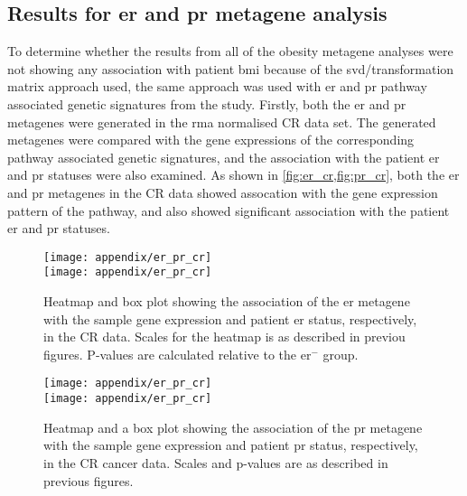 \begin{appendices}
\section{Results for \gls{er} and \gls{pr} metagene analysis}
\label{sec:results_for_er_and_pr_metagene_analysis}

To determine whether the results from all of the obesity metagene analyses were not showing any association with patient \gls{bmi} because of the \gls{svd}/transformation matrix approach used, the same approach was used with \gls{er} and \gls{pr} pathway associated genetic signatures from the \citet{Gatza2010a} study.
Firstly, both the \gls{er} and \gls{pr} metagenes were generated in the \gls{rma} normalised CR data set.
The generated metagenes were compared with the gene expressions of the corresponding pathway associated genetic signatures, and the association with the patient \gls{er} and \gls{pr} statuses were also examined.
As shown in \cref{fig:er_cr,fig:pr_cr}, both the \gls{er} and \gls{pr} metagenes in the CR data showed assocation with the gene expression pattern of the pathway, and also showed significant association with the patient \gls{er} and \gls{pr} statuses.

	\begin{figure}[htp!]
		\centering
		\texttt{[image: appendix/er\_pr\_cr]}\\
		\hfill
		\texttt{[image: appendix/er\_pr\_cr]}
		\caption[\acrshort{er} metagene in the CR data]{Heatmap and box plot showing the association of the \gls{er} metagene with the sample gene expression and patient \gls{er} status, respectively, in the CR data.
		Scales for the heatmap is as described in previou figures.
		P-values  are calculated relative to the \gls{er}$^-$ group.}
		\label{fig:er_cr}
	\end{figure}

	\begin{figure}[htp!]
		\centering
		\texttt{[image: appendix/er\_pr\_cr]}\\
		\hfill
		\texttt{[image: appendix/er\_pr\_cr]}
		\caption[\acrshort{pr} metagene in the CR data]{Heatmap and a box plot showing the association of the \gls{pr} metagene with the sample gene expression and patient \gls{pr} status, respectively, in the CR cancer data.
		Scales and  p-values are as described in previous figures.}
		\label{fig:pr_cr}
	\end{figure}


\end{appendices}
